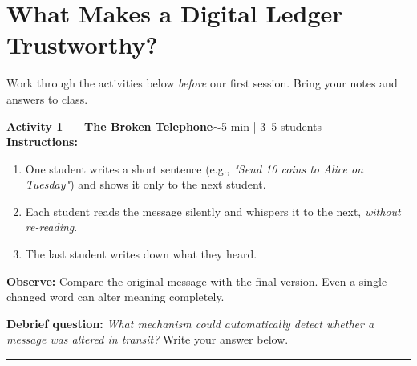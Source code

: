 \documentclass[11pt,a4paper]{article}
\newcommand{\activitybox}[3]{%
  \noindent\colorbox{mllavender4}{\parbox{\dimexpr\linewidth-2\fboxsep}{%
    \textbf{\color{mlpurple}#1}\hfill\textcolor{mlgray}{\small #2}\\[2pt]#3%
  }}\par\vspace{4pt}%
}
\begin{document}

\section*{\color{mlpurple}What Makes a Digital Ledger Trustworthy?}

\vspace{-2pt}
\noindent\textcolor{mlgray}{\small Work through the activities below \emph{before} our first session.
Bring your notes and answers to class.}
\vspace{4pt}

\activitybox{Activity 1 — The Broken Telephone}{$\sim$5 min | 3--5 students}{%
\textbf{Instructions:}
\begin{enumerate}
  \item One student writes a short sentence (e.g., \textit{"Send 10 coins to Alice on Tuesday"}) and shows it only to the next student.
  \item Each student reads the message silently and whispers it to the next, \emph{without re-reading}.
  \item The last student writes down what they heard.
\end{enumerate}
\textbf{Observe:} Compare the original message with the final version.
Even a single changed word can alter meaning completely.

\vspace{3pt}
\textbf{Debrief question:} \textit{What mechanism could automatically detect whether a message was altered in transit?} Write your answer below.

\vspace{10pt}
\noindent\rule{\linewidth}{0.3pt}
\vspace{6pt}
}
\end{document}
